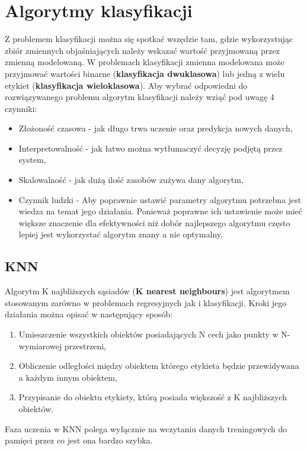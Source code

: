 \section{Algorytmy klasyfikacji}
Z problemem klasyfikacji można się spotkać wszędzie tam, gdzie wykorzystując
zbiór zmiennych objaśniających należy wskazać wartość przyjmowaną przez zmienną
modelowaną. W problemach klasyfikacji zmienna modelowana może przyjmować wartości
binarne (\textbf{klasyfikacja dwuklasowa}) lub jedną z wielu etykiet (\textbf{klasyfikacja wieloklasowa}).
Aby wybrać odpowiedni do rozwiązywanego problemu algorytm klasyfikacji należy wziąć 
pod uwagę 4 czynniki:
\begin{itemize}
    \item Złożoność czasowa - jak długo trwa uczenie oraz predykcja nowych danych,
    \item Interpretowalność - jak łatwo można wytłumaczyć decyzję podjętą przez 
    system,
    \item Skalowalność - jak dużą ilość zasobów zużywa dany algorytm,
    \item Czynnik ludzki - Aby poprawnie ustawić parametry algorytmu potrzebna
    jest wiedza na temat jego działania. Ponieważ poprawne ich ustawienie może 
    mieć większe znaczenie dla efektywności niż dobór najlepszego algorytmu często
    lepiej jest wykorzystać algorytm znany a nie optymalny.
\end{itemize}

\subsection{KNN}

Algorytm K najbliższych sąsiadów (\textbf{K nearest neighbours}) jest algorytmem
stosowanym zarówno w problemach regresyjnych jak i klasyfikacji. Kroki jego działania
można opisać w następujący sposób:
\begin{enumerate}
    \item Umieszczenie wszystkich obiektów posiadających N cech jako punkty w N-wymiarowej przestrzeni,
    \item Obliczenie odległości między obiektem którego etykieta będzie przewidywana a każdym innym
    obiektem,
    \item Przypisanie do obiektu etykiety, którą posiada większość z K najbliższych obiektów. 
\end{enumerate}
Faza uczenia w KNN polega wyłącznie na wczytaniu danych treningowych do pamięci przez co jest 
ona bardzo szybka.

